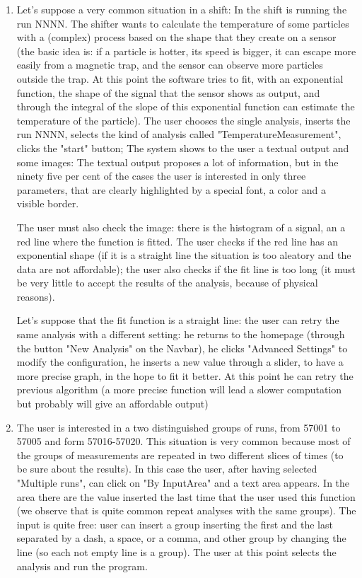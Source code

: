 \begin{enumerate}

\item
Let's suppose a very common situation in a shift: 
In the shift is running the run NNNN. The shifter wants to calculate the temperature of some particles with a (complex) process based on the shape that they create on a sensor (the basic idea is: if a particle is hotter, its speed is bigger, it can escape more easily from a magnetic trap, and the sensor can observe more particles outside the trap. At this point the software tries to fit, with an exponential function, the shape of the signal that the sensor shows as output, and through the integral of the slope of this exponential function can estimate the temperature of the particle).
The user chooses the single analysis, inserts the run NNNN, selects the kind of analysis called "TemperatureMeasurement", clicks the "start" button;
The system shows to the user a textual output and some images: 
The textual output proposes a lot of information, but in the ninety five per cent of the cases the user is interested in only three parameters, that are clearly highlighted by a special font, a color and a visible border. 

The user must also check the image: there is the histogram of a signal, an a red line where the function is fitted. The user checks if the red line
has an exponential shape (if it is a straight line the situation is too aleatory and the data are not affordable); the user also checks if the fit line is too long (it must be very little to accept the results of the analysis, because of physical reasons). 

Let's suppose that the fit function is a straight line: the user can retry the same analysis with a different setting: he returns to the homepage (through the button "New Analysis" on the Navbar), he clicks "Advanced Settings" to modify the configuration, he inserts a new value through a slider, to have a more precise graph, in the hope to fit it better. At this point he can retry the previous algorithm (a more precise function will lead a slower computation but probably will give an affordable output)  

\item 
The user is interested in a two distinguished groups of runs, from 57001 to 57005 and form 57016-57020.
This situation is very common because most of the groups of measurements are repeated in two different slices of times (to be sure about the results).
In this case the user, after having selected "Multiple runs", can click on "By InputArea" and a text area appears. In the area there are the value inserted the last time that the user used this function (we observe that is quite common repeat analyses with the same groups). The input is quite free: user can insert a group inserting the first and the last separated by a dash, a space, or a comma, and other group by changing the line (so each not empty line is a group). 
The user at this point selects the analysis and run the program. 


\end{enumerate}

